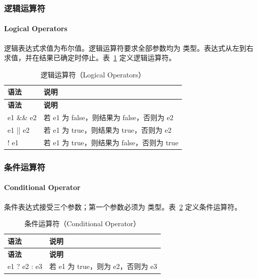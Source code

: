\subsubsection{逻辑运算符}
\paragraph*{Logical Operators}

逻辑表达式求值为布尔值。逻辑运算符要求全部参数均为  类型。表达式从左到右求值，并在结果已确定时停止。表~\ref{tab:pxl-logic-ops} 定义逻辑运算符。

\begin{longtable}{@{}>{\raggedright\arraybackslash\ttfamily}p{} p{}@{}}
\caption{逻辑运算符（Logical Operators）}\label{tab:pxl-logic-ops}\\
\toprule
\textbf{\textrm{语法}} & \textbf{\textrm{说明}} \\
\midrule
\endfirsthead
\toprule
\textbf{\textrm{语法}} & \textbf{\textrm{说明}} \\
\midrule
\endhead
\bottomrule
\endfoot
e1 \&\& e2 & 若 e1 为 false，则结果为 false，否则为 e2 \\
e1 || e2 & 若 e1 为 true，则结果为 true，否则为 e2 \\
! e1 & 若 e1 为 true，则结果为 false，否则为 true \\
\end{longtable}

\subsubsection{条件运算符}
\paragraph*{Conditional Operator}

条件表达式接受三个参数；第一个参数必须为  类型。表~\ref{tab:pxl-cond-op} 定义条件运算符。

\begin{longtable}{@{}>{\raggedright\arraybackslash\ttfamily}p{} p{}@{}}
\caption{条件运算符（Conditional Operator）}\label{tab:pxl-cond-op}\\
\toprule
\textbf{\textrm{语法}} & \textbf{\textrm{说明}} \\
\midrule
\endfirsthead
\toprule
\textbf{\textrm{语法}} & \textbf{\textrm{说明}} \\
\midrule
\endhead
\bottomrule
\endfoot
e1 ? e2 : e3 & 若 e1 为 true，则为 e2，否则为 e3 \\
\end{longtable}

